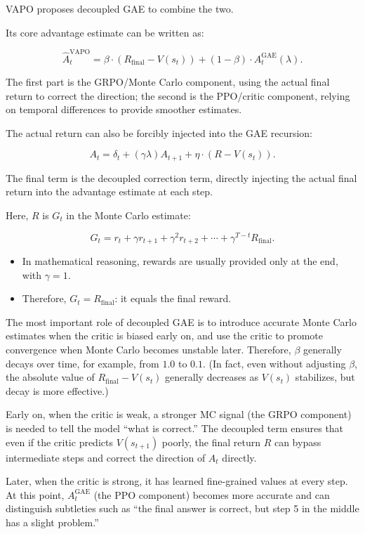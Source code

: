 VAPO proposes decoupled GAE to combine the two.

Its core advantage estimate can be written as:

\[
\hat{A}_t^{\mathrm{VAPO}}
=
\beta\cdot(R_{\mathrm{final}}-V(s_t))
+
(1-\beta)\cdot A_t^{\mathrm{GAE}}(\lambda).
\]

The first part is the GRPO/Monte Carlo component, using the actual final return to correct the direction; the second is the PPO/critic component, relying on temporal differences to provide smoother estimates.

The actual return can also be forcibly injected into the GAE recursion:

\[
A_t
=
\delta_t
+
(\gamma\lambda)A_{t+1}
+
\eta\cdot(R-V(s_t)).
\]

The final term is the decoupled correction term, directly injecting the actual final return into the advantage estimate at each step.

Here, \(R\) is \(G_t\) in the Monte Carlo estimate:

\[
G_t
=
r_t+\gamma r_{t+1}+\gamma^2 r_{t+2}
+\cdots+
\gamma^{T-t}R_{\mathrm{final}}.
\]

\begin{itemize}
\tightlist
\item
  In mathematical reasoning, rewards are usually provided only at the end, with \(\gamma=1\).
\item
  Therefore, \(G_t=R_{\mathrm{final}}\): it equals the final reward.
\end{itemize}

The most important role of decoupled GAE is to introduce accurate Monte Carlo estimates when the critic is biased early on, and use the critic to promote convergence when Monte Carlo becomes unstable later. Therefore, \(\beta\) generally decays over time, for example, from \(1.0\) to \(0.1\). (In fact, even without adjusting \(\beta\), the absolute value of \(R_{\mathrm{final}}-V(s_t)\) generally decreases as \(V(s_t)\) stabilizes, but decay is more effective.)

Early on, when the critic is weak, a stronger MC signal (the GRPO component) is needed to tell the model ``what is correct.'' The decoupled term ensures that even if the critic predicts \(V(s_{t+1})\) poorly, the final return \(R\) can bypass intermediate steps and correct the direction of \(A_t\) directly.

Later, when the critic is strong, it has learned fine-grained values at every step. At this point, \(A_t^{\mathrm{GAE}}\) (the PPO component) becomes more accurate and can distinguish subtleties such as ``the final answer is correct, but step 5 in the middle has a slight problem.''

